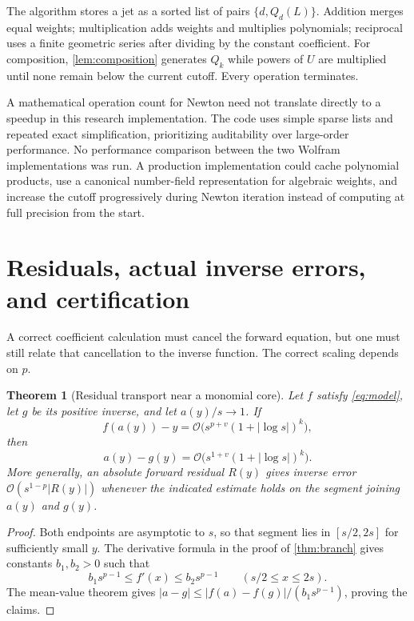 \documentclass[11pt,a4paper]{article}
\numberwithin{equation}{section}
\newtheorem{theorem}{Theorem}[section]
\theoremstyle{definition}
\newcommand{\OO}{\mathcal O}
\begin{document}
The algorithm stores a jet as a sorted list of pairs
$\{d,Q_d(L)\}$. Addition merges equal weights; multiplication adds
weights and multiplies polynomials; reciprocal uses a finite geometric
series after dividing by the constant coefficient. For composition,
\cref{lem:composition} generates $Q_k$ while powers of $U$ are multiplied
until none remain below the current cutoff. Every operation terminates.

A mathematical operation count for Newton need not translate directly to
a speedup in this research implementation. The code uses simple sparse
lists and repeated exact simplification, prioritizing auditability over
large-order performance. No performance comparison between the two
Wolfram implementations was run. A production implementation could cache
polynomial products, use a canonical number-field representation for
algebraic weights, and increase the cutoff progressively during Newton
iteration instead of computing at full precision from the start.

\section{Residuals, actual inverse errors, and certification}
\label{sec:residual}

A correct coefficient calculation must cancel the forward equation, but
one must still relate that cancellation to the inverse function. The
correct scaling depends on $p$.

\begin{theorem}[Residual transport near a monomial core]
\label{thm:residual}
Let $f$ satisfy \eqref{eq:model}, let $g$ be its positive inverse, and let
$a(y)/s\to1$. If
\[
 f(a(y))-y=\OO\bigl(s^{p+v}(1+|\log s|)^k\bigr),
\]
then
\begin{equation}\label{eq:residual-transport}
 a(y)-g(y)=\OO\bigl(s^{1+v}(1+|\log s|)^k\bigr).
\end{equation}
More generally, an absolute forward residual $R(y)$ gives inverse error
$\OO(s^{1-p}|R(y)|)$ whenever the indicated estimate holds on the
segment joining $a(y)$ and $g(y)$.
\end{theorem}
\begin{proof}
Both endpoints are asymptotic to $s$, so that segment lies in
$[s/2,2s]$ for sufficiently small $y$. The derivative formula in the proof
of \cref{thm:branch} gives constants $b_1,b_2>0$ such that
\[
 b_1 s^{p-1}\le f'(x)\le b_2 s^{p-1}\qquad(s/2\le x\le2s).
\]
The mean-value theorem gives
$|a-g|\le |f(a)-f(g)|/(b_1s^{p-1})$, proving the claims.
\end{proof}
\end{document}
